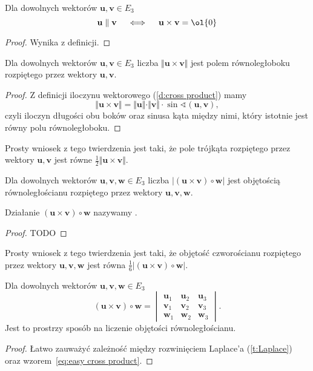 \begin{fact}
    Dla dowolnych wektorów $\mathbf{u}, \mathbf{v} \in E_3$
    \[ \mathbf{u} \parallel \mathbf{v} \quad \iff \quad \mathbf{u} \times \mathbf{v} = \ol{0} \]
\end{fact}
\begin{proof}
    Wynika z definicji.
\end{proof}

\begin{theorem}
    \label{t:area of parallelogram}
    Dla dowolnych wektorów $\mathbf{u}, \mathbf{v} \in E_3$ liczba $\Vert\mathbf{u}\times\mathbf{v}\Vert$ jest polem równoległoboku rozpiętego przez wektory $\mathbf{u}, \mathbf{v}$.
\end{theorem}
\begin{proof}
    Z definicji iloczynu wektorowego (\ref{d:cross product}) mamy
    \[ \Vert\mathbf{u}\times\mathbf{v}\Vert = \Vert\mathbf{u}\Vert\cdot\Vert\mathbf{v}\Vert\cdot\sin\sphericalangle(\mathbf{u}, \mathbf{v}), \]
    czyli iloczyn długości obu boków oraz sinusa kąta między nimi, który istotnie jest równy polu równoległoboku.
\end{proof}

Prosty wniosek z tego twierdzenia jest taki, że pole trójkąta rozpiętego przez wektory $\mathbf{u}, \mathbf{v}$ jest równe $\frac{1}{2}\Vert\mathbf{u}\times\mathbf{v}\Vert$.

\begin{theorem}
    \label{t:volume of parallelepiped}
    Dla dowolnych wektorów $\mathbf{u}, \mathbf{v}, \mathbf{w} \in E_3$ liczba $|(\mathbf{u}\times\mathbf{v}) \circ \mathbf{w}|$ jest objętością równoległościanu rozpiętego przez wektory $\mathbf{u}, \mathbf{v}, \mathbf{w}$.
\end{theorem}
Działanie $(\mathbf{u}\times\mathbf{v}) \circ \mathbf{w}$ nazywamy .
\begin{proof}
    TODO
\end{proof}

Prosty wniosek z tego twierdzenia jest taki, że objętość czworościanu rozpiętego przez wektory $\mathbf{u}, \mathbf{v}, \mathbf{w}$ jest równa $\frac{1}{6}|(\mathbf{u}\times\mathbf{v}) \circ \mathbf{w}|$.

\begin{fact}
    \label{f:triple product}
    Dla dowolnych wektorów $\mathbf{u}, \mathbf{v}, \mathbf{w} \in E_3$
    \[ (\mathbf{u}\times\mathbf{v}) \circ \mathbf{w} = \begin{vmatrix}
        \mathbf{u}_1 & \mathbf{u}_2 & \mathbf{u}_3 \\
        \mathbf{v}_1 & \mathbf{v}_2 & \mathbf{v}_3 \\
        \mathbf{w}_1 & \mathbf{w}_2 & \mathbf{w}_3
    \end{vmatrix}. \]
    Jest to prostrzy sposób na liczenie objętości równoległościanu.
\end{fact}
\begin{proof}
    Łatwo zauważyć zależność między rozwinięciem Laplace'a (\ref{t:Laplace}) oraz wzorem~\ref{eq:easy cross product}.
\end{proof}

